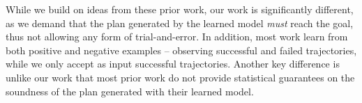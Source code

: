 \documentclass{article}
\begin{document}
	
	While we build on ideas from these prior work, our work is significantly different, as we demand that  the plan generated by the learned model {\em must} reach the goal, thus not allowing any form of trial-and-error. 
	In addition, most work learn from both positive and negative examples -- observing successful and failed trajectories, while we only accept as input successful trajectories. 
	Another key difference is unlike our work that most prior work do not provide statistical guarantees on the soundness of the plan generated with their learned model. 
	
	
	
\end{document}
